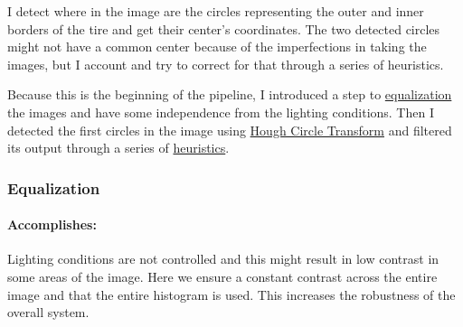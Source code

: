 I detect where in the image are the circles representing the outer and inner borders of the tire and get their center's coordinates. The two detected circles might not have a common center because of the imperfections in taking the images, but I account and try to correct for that through a series of heuristics.

Because this is the beginning of the pipeline, I introduced a step to \hyperref[subsubsec:equalization]{equalization} the images and have some independence from the lighting conditions. Then I detected the first circles in the image using \hyperref[subsubsec:hough_circles_transform]{Hough Circle Transform} and filtered its output through a series of \hyperref[subsubsec:circ_det_heuristics]{heuristics}.

\subsubsection{Equalization}
\label{subsubsec:equalization}

\paragraph*{Accomplishes:}\mbox{}\par
Lighting conditions are not controlled and this might result in low contrast in some areas of the image. Here we ensure a constant contrast across the entire image and that the entire histogram is used. This increases the robustness of the overall system.

